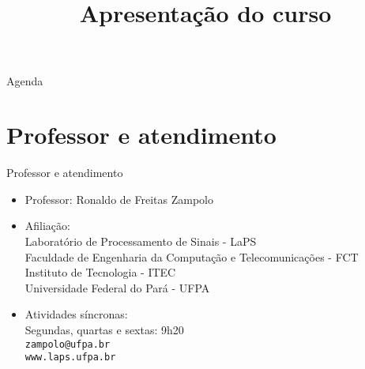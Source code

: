 


\title{\cursogrande\\ \vspace{1cm}Apresentação do curso}


   \maketitle[randomdots={false}]
   \begin{slide}{Agenda}
      \tableofcontents[content=sections]
   \end{slide}

   \section[ slide = true]{Professor e atendimento}
      \begin{slide}[toc=]{Professor e atendimento}
         \begin{itemize}[type=1]
            \item Professor: Ronaldo de Freitas Zampolo 
            \item Afiliação:\\
                  Laboratório de Processamento de Sinais - LaPS\\
                  Faculdade de Engenharia da Computação e Telecomunicações - FCT\\
                  Instituto de Tecnologia - ITEC\\
                  Universidade Federal do Pará - UFPA
            \item Atividades síncronas:\\
                  Segundas, quartas e sextas: 9h20\\
                  \texttt{zampolo@ufpa.br}\\ 
                  \texttt{www.laps.ufpa.br}
         \end{itemize}
      \end{slide}

